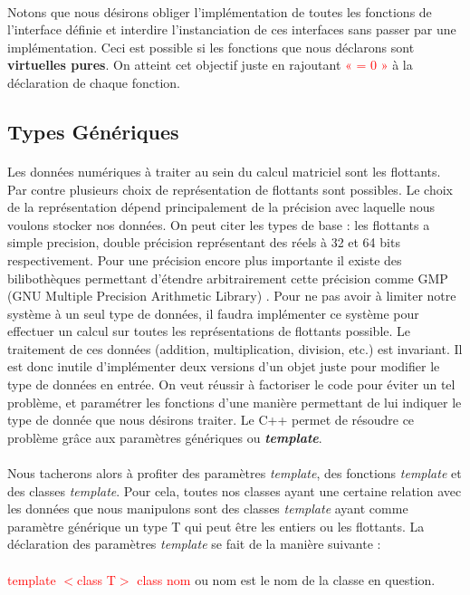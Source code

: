 \documentclass[a4paper, 10pt]{report}
\begin{document}
\paragraph*{}
Notons que nous désirons obliger l’implémentation de toutes les fonctions de l’interface définie et interdire 
l’instanciation de ces interfaces sans passer par une implémentation. Ceci est possible si les fonctions que nous 
déclarons sont \textbf{virtuelles pures}. On atteint cet objectif juste en rajoutant \textcolor{red}{« = 0 »} à la déclaration de chaque fonction.

\subsection{Types Génériques}
\paragraph*{}
Les données numériques à traiter au sein du calcul matriciel sont les flottants. Par contre plusieurs choix de représentation
de flottants sont possibles. Le choix de la représentation dépend principalement de la précision avec laquelle nous voulons
stocker nos données. On peut citer les types de base : les flottants a simple precision, double précision représentant des réels
à 32 et 64 bits respectivement. Pour une précision encore plus importante il existe des bilibothèques permettant d'étendre
arbitrairement cette précision comme GMP (GNU Multiple Precision Arithmetic Library) \cite{GMP}.
Pour ne pas avoir à limiter notre système à un seul type de données, il faudra implémenter ce système pour effectuer un 
calcul sur toutes les représentations de flottants possible. Le traitement de ces données (addition, multiplication, division, etc.) est invariant. 
Il est donc inutile d’implémenter deux versions d’un objet juste pour modifier le type de données en entrée. On veut réussir 
à factoriser le code pour éviter un tel problème, et paramétrer les fonctions d’une manière permettant de lui indiquer le 
type de donnée que nous désirons traiter. Le C++ permet de résoudre ce problème grâce aux paramètres génériques
 ou \textbf{\textit{template}}.
\paragraph*{}
Nous tacherons alors à profiter des paramètres \textit{template}, des fonctions \textit{template} et des classes 
\textit{template}. Pour cela, toutes nos classes ayant une certaine relation avec les données que nous manipulons 
sont des classes \textit{template} ayant comme paramètre générique un type T qui peut être les entiers ou les flottants.\newline
La déclaration des paramètres \textit{template} se fait de la manière suivante :\paragraph*{}
\textcolor{red}{template $<$class T$>$ class nom} ou nom est le nom de la classe en question.
\end{document}
